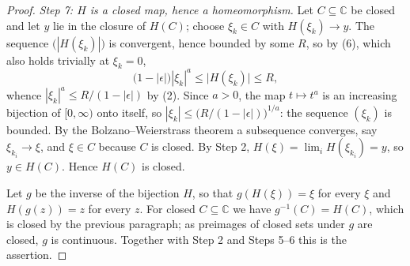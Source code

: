 \begin{proof}
\emph{Step 7: $H$ is a closed map, hence a homeomorphism.}  Let
$C\subseteq\mathbb{C}$ be closed and let $y$ lie in the closure of $H(C)$;
choose $\xi_k\in C$ with $H(\xi_k)\to y$.  The sequence $\bigl(|H(\xi_k)|\bigr)$
is convergent, hence bounded by some $R$, so by (6), which also holds trivially
at $\xi_k=0$,
\[
  \bigl(1-|\epsilon|\bigr)|\xi_k|^{a}\le\bigl|H(\xi_k)\bigr|\le R ,
\]
whence $|\xi_k|^{a}\le R/(1-|\epsilon|)$ by (2).  Since $a>0$, the map
$t\mapsto t^{a}$ is an increasing bijection of $[0,\infty)$ onto itself, so
$|\xi_k|\le\bigl(R/(1-|\epsilon|)\bigr)^{1/a}$: the sequence
$(\xi_k)$ is bounded.  By the Bolzano--Weierstrass theorem a subsequence
converges, say $\xi_{k_i}\to\xi$, and $\xi\in C$ because $C$ is closed.  By
Step 2, $H(\xi)=\lim_iH(\xi_{k_i})=y$, so $y\in H(C)$.  Hence $H(C)$ is closed.

Let $g$ be the inverse of the bijection $H$, so that $g(H(\xi))=\xi$ for every
$\xi$ and $H(g(z))=z$ for every $z$.  For closed $C\subseteq\mathbb{C}$ we have
$g^{-1}(C)=H(C)$, which is closed by the previous paragraph; as preimages of
closed sets under $g$ are closed, $g$ is continuous.  Together with Step 2 and
Steps 5--6 this is the assertion.
\end{proof}
